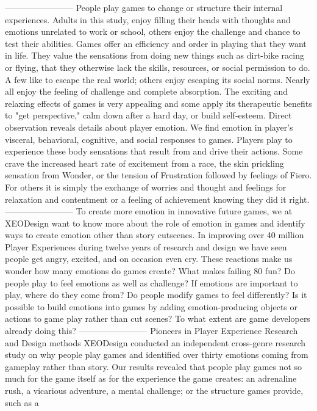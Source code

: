 ------------------------
People play games to change or structure their internal experiences. Adults in this study, 
enjoy filling their heads with thoughts and emotions unrelated to work or school, 
others enjoy the challenge and chance to test their abilities. Games offer an efficiency 
and order in playing that they want in life. They value the sensations from doing new 
things such as dirt-bike racing or flying, that they otherwise lack the skills, 
resources, or social permission to do. A few like to escape the real world; others 
enjoy escaping its social norms. Nearly all enjoy the feeling of challenge and complete 
absorption. The exciting and relaxing effects of games is very appealing and some apply 
its therapeutic benefits to "get perspective," calm down after a hard day, or build 
self-esteem. Direct observation reveals details about player emotion. We find emotion 
in player's visceral, behavioral, cognitive, and social responses to games. Players play 
to experience these body sensations that result from and drive their actions. Some crave 
the increased heart rate of excitement from a race, the skin prickling sensation from 
Wonder, or the tension of Frustration followed by feelings of Fiero. For others it is 
simply the exchange of worries and thought and feelings for relaxation and contentment 
or a feeling of achievement knowing they did it right.
------------------------
To create more emotion in innovative future games, we at XEODesign want to know more
about the role of emotion in games and identify ways to create emotion other than story 
cutscenes. In improving over 40 million Player Experiences during twelve years of research and
design we have seen people get angry, excited, and on occasion even cry. These reactions
make us wonder how many emotions do games create? What makes failing 80%
fun? Do people play to feel emotions as well as challenge? If emotions are important to play,
where do they come from? Do people modify games to feel differently? Is it possible to build
emotions into games by adding emotion-producing objects or actions to game play rather than
cut scenes? To what extent are game developers already doing this?
------------------------
Pioneers in Player Experience Research and Design methods XEODesign conducted an
independent cross-genre research study on why people play games and identified over thirty
emotions coming from gameplay rather than story. Our results revealed that people play
games not so much for the game itself as for the experience the game creates: an adrenaline
rush, a vicarious adventure, a mental challenge; or the structure games provide, such as a
